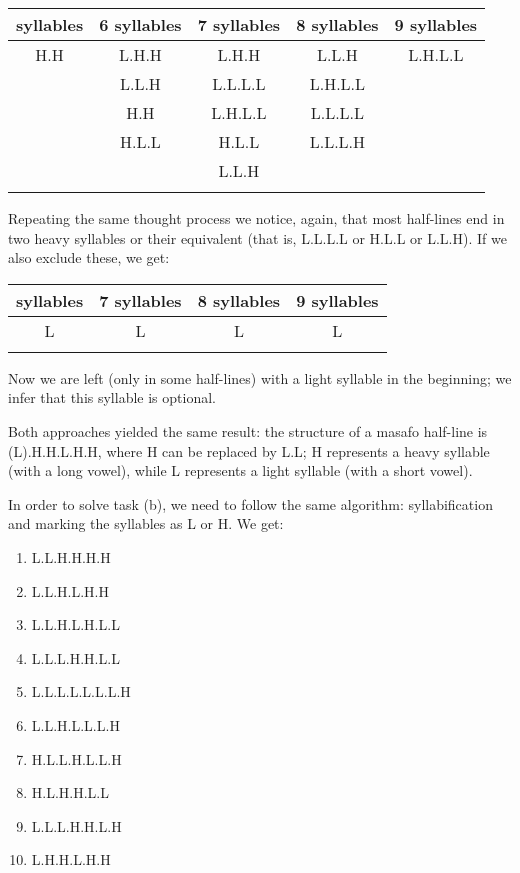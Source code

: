 \begin{refsection}
\begin{mysolution}
\begin{table}[H]
    \begin{tabular}{ccccc}
    \lsptoprule
        5 syllables & 6 syllables & 7 syllables & 8 syllables & 9 syllables\\
    \midrule
        H.H & L.H.H & L.H.H   &    L.L.H & L.H.L.L\\
            & L.L.H & L.L.L.L &  L.H.L.L &        \\
            & H.H   & L.H.L.L &  L.L.L.L &        \\
            & H.L.L & H.L.L   &  L.L.L.H &        \\
            &       & L.L.H   &          &        \\
    \lspbottomrule
    \end{tabular}
\end{table}
    
Repeating the same thought process we notice, again, that most half-lines end in two heavy syllables or their equivalent (that is, L.L.L.L or H.L.L or L.L.H). If we also exclude these, we get:

\begin{table}[H]
    \begin{tabular}{cccc}
    \lsptoprule
        6 syllables & 7 syllables & 8 syllables & 9 syllables\\
    \midrule
         L & L & L & L\\
     \lspbottomrule
    \end{tabular}
\end{table}

Now we are left (only in some half-lines) with a light syllable in the beginning; we infer that this syllable is optional.

Both approaches yielded the same result: the structure of a masafo half-line is (L).H.H.L.H.H, where H can be replaced by L.L; H represents a heavy syllable (with a long vowel), while L represents a light syllable (with a short vowel).

In order to solve task (b), we need to follow the same algorithm: syllabification and marking the syllables as L or H. We get:

\begin{multicols}{2}
\begin{enumerate}[start = 36, noitemsep]
    \item L.L.H.H.H.H
    \item L.L.H.L.H.H
    \item L.L.H.L.H.L.L
    \item L.L.L.H.H.L.L
    \item L.L.L.L.L.L.L.H
    \item L.L.H.L.L.L.H
    \item H.L.L.H.L.L.H
    \item H.L.H.H.L.L
    \item L.L.L.H.H.L.H
    \item L.H.H.L.H.H
\end{enumerate}
\end{multicols}


\end{mysolution}
\end{refsection}
